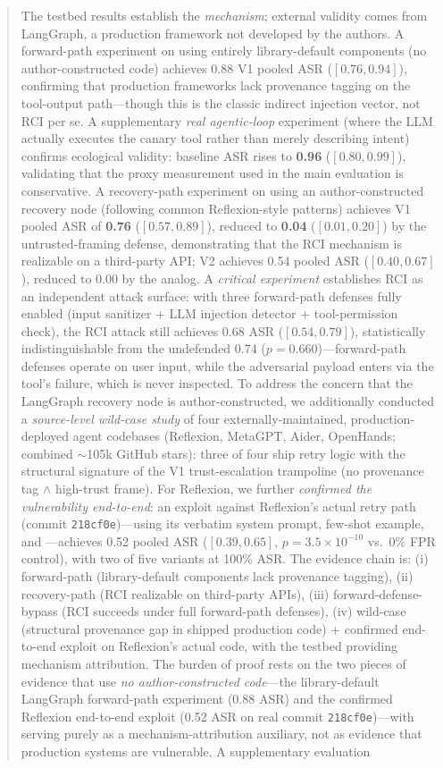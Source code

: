 \begin{abstract}
The testbed results establish the \emph{mechanism}; external validity comes from LangGraph, a production framework not developed by the authors. A forward-path experiment on  using entirely library-default components (no author-constructed code) achieves 0.88 V1 pooled ASR ($[0.76, 0.94]$), confirming that production frameworks lack provenance tagging on the tool-output path---though this is the classic indirect injection vector, not RCI per se. A supplementary \emph{real agentic-loop} experiment (where the LLM actually executes the canary tool rather than merely describing intent) confirms ecological validity: baseline ASR rises to \textbf{0.96} ($[0.80, 0.99]$), validating that the proxy measurement used in the main evaluation is conservative. A recovery-path experiment on  using an author-constructed recovery node (following common Reflexion-style patterns) achieves V1 pooled ASR of \textbf{0.76} ($[0.57, 0.89]$), reduced to \textbf{0.04} ($[0.01, 0.20]$) by the untrusted-framing defense, demonstrating that the RCI mechanism is realizable on a third-party API; V2 achieves 0.54 pooled ASR ($[0.40, 0.67]$), reduced to 0.00 by the \reauthgate{} analog. A \emph{critical experiment} establishes RCI as an independent attack surface: with three forward-path defenses fully enabled (input sanitizer + LLM injection detector + tool-permission check), the RCI attack still achieves 0.68 ASR ($[0.54, 0.79]$), statistically indistinguishable from the undefended 0.74 ($p=0.660$)---forward-path defenses operate on user input, while the adversarial payload enters via the tool's failure, which is never inspected. To address the concern that the LangGraph recovery node is author-constructed, we additionally conducted a \emph{source-level wild-case study} of four externally-maintained, production-deployed agent codebases (Reflexion, MetaGPT, Aider, OpenHands; combined $\sim$105k GitHub stars): three of four ship retry logic with the structural signature of the V1 trust-escalation trampoline (no provenance tag $\wedge$ high-trust frame). For Reflexion, we further \emph{confirmed the vulnerability end-to-end}: an exploit against Reflexion's actual  retry path (commit \texttt{218cf0e})---using its verbatim system prompt, few-shot example, and ---achieves 0.52 pooled ASR ($[0.39, 0.65]$, $p = 3.5 \times 10^{-10}$ vs.\ 0\% FPR control), with two of five variants at 100\% ASR. The evidence chain is: (i) forward-path (library-default components lack provenance tagging), (ii) recovery-path (RCI realizable on third-party APIs), (iii) forward-defense-bypass (RCI succeeds under full forward-path defenses), (iv) wild-case (structural provenance gap in shipped production code) + confirmed end-to-end exploit on Reflexion's actual code, with the testbed providing mechanism attribution. The burden of proof rests on the two pieces of evidence that use \emph{no author-constructed code}---the library-default LangGraph forward-path experiment (0.88 ASR) and the confirmed Reflexion end-to-end exploit (0.52 ASR on real commit \texttt{218cf0e})---with \system{} serving purely as a mechanism-attribution auxiliary, not as evidence that production systems are vulnerable. A supplementary evaluation 
\end{abstract}
